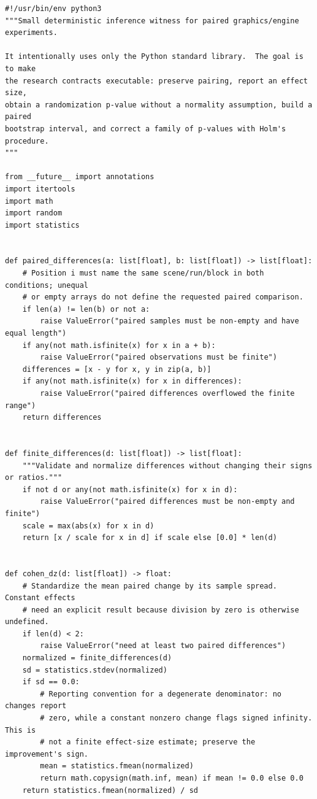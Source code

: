 \begin{verbatim}
#!/usr/bin/env python3
"""Small deterministic inference witness for paired graphics/engine experiments.

It intentionally uses only the Python standard library.  The goal is to make
the research contracts executable: preserve pairing, report an effect size,
obtain a randomization p-value without a normality assumption, build a paired
bootstrap interval, and correct a family of p-values with Holm's procedure.
"""

from __future__ import annotations
import itertools
import math
import random
import statistics


def paired_differences(a: list[float], b: list[float]) -> list[float]:
    # Position i must name the same scene/run/block in both conditions; unequal
    # or empty arrays do not define the requested paired comparison.
    if len(a) != len(b) or not a:
        raise ValueError("paired samples must be non-empty and have equal length")
    if any(not math.isfinite(x) for x in a + b):
        raise ValueError("paired observations must be finite")
    differences = [x - y for x, y in zip(a, b)]
    if any(not math.isfinite(x) for x in differences):
        raise ValueError("paired differences overflowed the finite range")
    return differences


def finite_differences(d: list[float]) -> list[float]:
    """Validate and normalize differences without changing their signs or ratios."""
    if not d or any(not math.isfinite(x) for x in d):
        raise ValueError("paired differences must be non-empty and finite")
    scale = max(abs(x) for x in d)
    return [x / scale for x in d] if scale else [0.0] * len(d)


def cohen_dz(d: list[float]) -> float:
    # Standardize the mean paired change by its sample spread. Constant effects
    # need an explicit result because division by zero is otherwise undefined.
    if len(d) < 2:
        raise ValueError("need at least two paired differences")
    normalized = finite_differences(d)
    sd = statistics.stdev(normalized)
    if sd == 0.0:
        # Reporting convention for a degenerate denominator: no changes report
        # zero, while a constant nonzero change flags signed infinity. This is
        # not a finite effect-size estimate; preserve the improvement's sign.
        mean = statistics.fmean(normalized)
        return math.copysign(math.inf, mean) if mean != 0.0 else 0.0
    return statistics.fmean(normalized) / sd



\end{verbatim}
